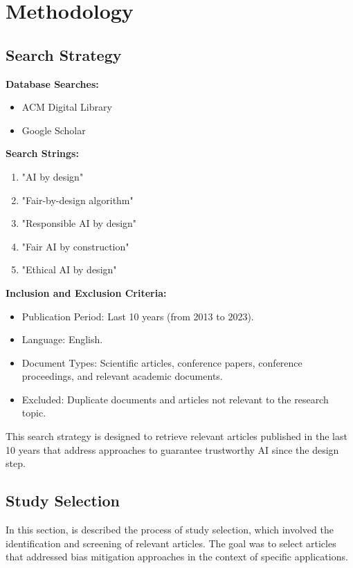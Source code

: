 \documentclass{article}
\begin{document}
\section{Methodology}
    \subsection{Search Strategy}
    \textbf{Database Searches:}
\begin{itemize}
    \item ACM Digital Library
    \item Google Scholar
\end{itemize}

\textbf{Search Strings:}
\begin{enumerate}
    \item "AI by design"
    \item "Fair-by-design algorithm"
    \item "Responsible AI by design"
    \item "Fair AI by construction"
    \item "Ethical AI by design"
\end{enumerate}

\textbf{Inclusion and Exclusion Criteria:}
\begin{itemize}
    \item Publication Period: Last 10 years (from 2013 to 2023).
    \item Language: English.
    \item Document Types: Scientific articles, conference papers, conference proceedings, and relevant academic documents.
    \item Excluded: Duplicate documents and articles not relevant to the research topic.
\end{itemize}

This search strategy is designed to retrieve relevant articles published in the last 10 years that address approaches to guarantee trustworthy AI since the design step.

    \subsection{Study Selection}
    In this section, is described the process of study selection, which involved the identification and screening of relevant articles. The goal was to select articles that addressed bias mitigation approaches in the context of specific applications.
\end{document}
